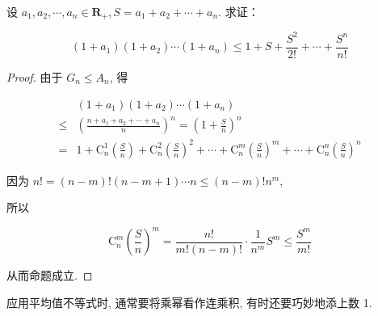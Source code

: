 \begin{example}
	设 $a_{1}, a_{2}, \cdots, a_{n} \in \mathbf{R}_{+}, S=a_{1}+a_{2}+\cdots+a_{n}$. 求证：
	
	$$
	\left(1+a_{1}\right)\left(1+a_{2}\right) \cdots\left(1+a_{n}\right) \leqslant 1+S+\frac{S^{2}}{2!}+\cdots+\frac{S^{n}}{n!}
	$$
\end{example}
\begin{proof}
	由于 $G_{n} \leqslant A_{n}$, 得
	
	$$
	\begin{aligned}
	& \left(1+a_{1}\right)\left(1+a_{2}\right) \cdots\left(1+a_{n}\right) \\
	\leqslant & \left(\frac{n+a_{1}+a_{2}+\cdots+a_{n}}{n}\right)^{n}=\left(1+\frac{S}{n}\right)^{n} \\
	= & 1+\mathrm{C}_{n}^{1}\left(\frac{S}{n}\right)+\mathrm{C}_{n}^{2}\left(\frac{S}{n}\right)^{2}+\cdots+\mathrm{C}_{n}^{m}\left(\frac{S}{n}\right)^{m}+\cdots+\mathrm{C}_{n}^{n}\left(\frac{S}{n}\right)^{n}
	\end{aligned}
	$$
	
	因为 $n!=(n-m)!(n-m+1) \cdots n \leqslant(n-m)!n^{m}$,
	
	所以
	
	$$
	\mathrm{C}_{n}^{m}\left(\frac{S}{n}\right)^{m}=\frac{n!}{m!(n-m)!} \cdot \frac{1}{n^{m}} S^{m} \leqslant \frac{S^{m}}{m!}
	$$
	
	从而命题成立.
\end{proof}
\begin{note}
	应用平均值不等式时, 通常要将乘幂看作连乘积, 有时还要巧妙地添上数 1.
\end{note}

